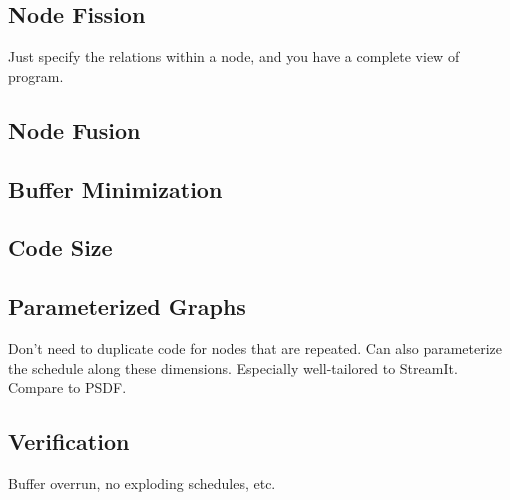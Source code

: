 \subsection{Node Fission}

Just specify the relations within a node, and you have a complete view
of program.

\subsection{Node Fusion}

\subsection{Buffer Minimization}

\subsection{Code Size}

\subsection{Parameterized Graphs}

Don't need to duplicate code for nodes that are repeated.  Can also
parameterize the schedule along these dimensions.  Especially
well-tailored to StreamIt.  Compare to PSDF.

\subsection{Verification}

Buffer overrun, no exploding schedules, etc.

